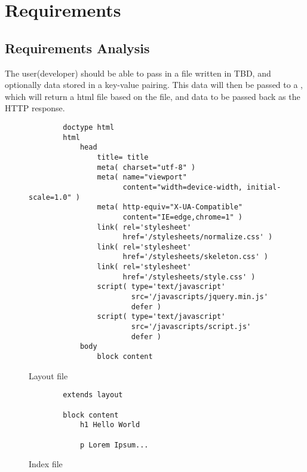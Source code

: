 \chapter{Requirements}
\section{Requirements Analysis}
The user(developer) should be able to pass in a file written in TBD, and optionally data stored in
a key-value pairing. This data will then be passed to a \compiler{}, which will return a html
file based on the file, and data to be passed back as the HTTP response.

\begin{figure}[ht!]
    \small
    \begin{verbatim}
        doctype html
        html
            head
                title= title
                meta( charset="utf-8" )
                meta( name="viewport" 
                      content="width=device-width, initial-scale=1.0" )
                meta( http-equiv="X-UA-Compatible" 
                      content="IE=edge,chrome=1" )
                link( rel='stylesheet'
                      href='/stylesheets/normalize.css' )
                link( rel='stylesheet' 
                      href='/stylesheets/skeleton.css' )
                link( rel='stylesheet' 
                      href='/stylesheets/style.css' )
                script( type='text/javascript' 
                        src='/javascripts/jquery.min.js' 
                        defer )
                script( type='text/javascript'
                        src='/javascripts/script.js' 
                        defer )
            body
                block content
    \end{verbatim}
    \caption{Layout file}
\end{figure}

\begin{figure}[ht!]
    \small
    \begin{verbatim}
        extends layout

        block content
            h1 Hello World

            p Lorem Ipsum...
    \end{verbatim}
    \caption{Index file}
\end{figure}

